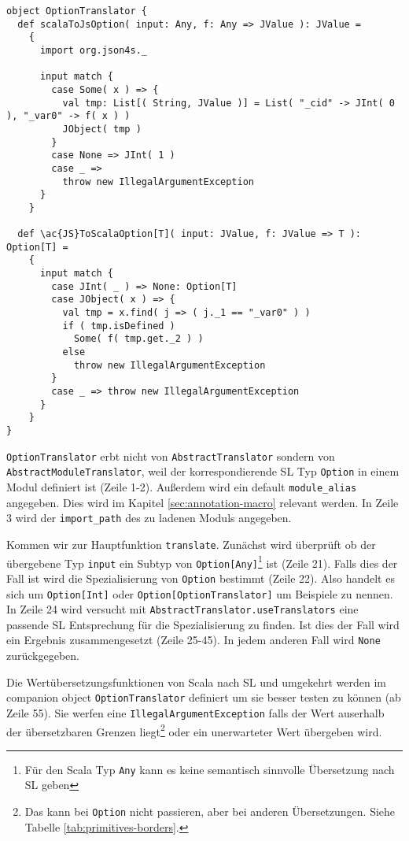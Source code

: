 \documentclass[12pt,a4paper]{report}
\begin{document}
\begin{lstlisting}[caption=Source Code von OptionTranslator, label=lst:source option translator]
object OptionTranslator {
  def scalaToJsOption( input: Any, f: Any => JValue ): JValue =
    {
      import org.json4s._

      input match {
        case Some( x ) => {
          val tmp: List[( String, JValue )] = List( "_cid" -> JInt( 0 ), "_var0" -> f( x ) )
          JObject( tmp )
        }
        case None => JInt( 1 )
        case _ =>
          throw new IllegalArgumentException
      }
    }

  def \ac{JS}ToScalaOption[T]( input: JValue, f: JValue => T ): Option[T] =
    {
      input match {
        case JInt( _ ) => None: Option[T]
        case JObject( x ) => {
          val tmp = x.find( j => ( j._1 == "_var0" ) )
          if ( tmp.isDefined )
            Some( f( tmp.get._2 ) )
          else
            throw new IllegalArgumentException
        }
        case _ => throw new IllegalArgumentException
      }
    }
}

\end{lstlisting}

\lstinline!OptionTranslator! erbt nicht von \lstinline!AbstractTranslator! sondern von \lstinline!AbstractModuleTranslator!, weil der korrespondierende \ac{SL} Typ \lstinline!Option! in einem Modul definiert ist (Zeile 1-2). Außerdem wird ein default \lstinline!module_alias! angegeben. Dies wird im Kapitel \ref{sec:annotation-macro} relevant werden. In Zeile 3 wird der \lstinline!import_path! des zu ladenen Moduls angegeben. 

Kommen wir zur Hauptfunktion \lstinline!translate!. Zunächst wird überprüft ob der übergebene Typ \lstinline!input! ein Subtyp von \lstinline!Option[Any]!\footnote{Für den Scala Typ \lstinline!Any! kann es keine semantisch sinnvolle Übersetzung nach \ac{SL} geben} ist (Zeile 21). Falls dies der Fall ist wird die Spezialisierung von \lstinline!Option! bestimmt (Zeile 22). Also handelt es sich um \lstinline!Option[Int]! oder \lstinline!Option[OptionTranslator]! um Beispiele zu nennen. In Zeile 24 wird versucht mit \lstinline!AbstractTranslator.useTranslators! eine passende \ac{SL} Entsprechung für die Spezialisierung zu finden. Ist dies der Fall wird ein Ergebnis zusammengesetzt (Zeile 25-45). In jedem anderen Fall wird \lstinline!None! zurückgegeben.

Die Wertübersetzungsfunktionen von Scala nach \ac{SL} und umgekehrt werden im companion object \lstinline!OptionTranslator! definiert um sie besser testen zu können (ab Zeile 55). Sie werfen eine \lstinline!IllegalArgumentException! falls der Wert auserhalb der übersetzbaren Grenzen liegt\footnote{Das kann bei \lstinline!Option! nicht passieren, aber bei anderen Übersetzungen. Siehe Tabelle \ref{tab:primitives-borders}.} oder ein unerwarteter Wert übergeben wird.
\end{document}
